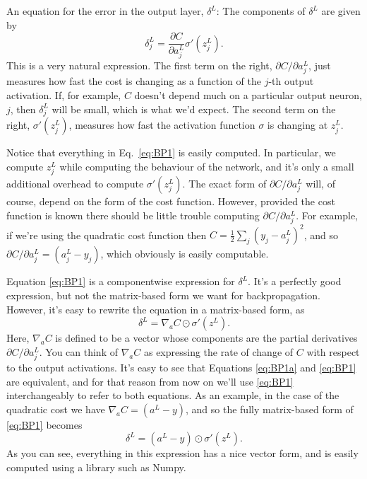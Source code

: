 \documentclass[a4paper,twoside,10pt]{book}
\begin{document}
An equation for the error in the output layer, $\delta^L$: The components of $\delta^L$ are given by
\begin{equation}
	\delta^L_j = \frac{\partial C}{\partial a^L_j} \sigma'(z^L_j).
	\tag{BP1}
	\label{eq:BP1}
\end{equation}
This is a very natural expression. The first term on the right, $\partial{}C/\partial{}a^L_j$, just measures how fast the cost is changing as a function of the $j$-th output activation. If, for example, $C$ doesn't depend much on a particular output neuron, $j$, then $\delta^L_j$ will be small, which is what we'd expect. The second term on the right, $\sigma'(z^L_j)$, measures how fast the activation function $\sigma$ is changing at $z^L_j$.

Notice that everything in Eq.~\ref{eq:BP1} is easily computed. In particular, we compute $z^L_j$ while computing the behaviour of the network, and it's only a small additional overhead to compute $\sigma'(z^L_j)$. The exact form of $\partial{}C/\partial{}a^L_j$ will, of course, depend on the form of the cost function. However, provided the cost function is known there should be little trouble computing $\partial{}C/\partial{}a^L_j$. For example, if we're using the quadratic cost function then $C=\frac12\sum_j(y_j-a^L_j)^2$, and so $\partial{}C/\partial{}a^L_j=(a^L_j-y_j)$, which obviously is easily computable.

Equation \ref{eq:BP1} is a componentwise expression for $\delta^L$. It's a perfectly good expression, but not the matrix-based form we want for backpropagation. However, it's easy to rewrite the equation in a matrix-based form, as
\begin{equation}
\delta^L = \nabla_a C \odot \sigma'(z^L).
\tag{BP1a}
\label{eq:BP1a}
\end{equation}
Here, $\nabla_a C$ is defined to be a vector whose components are the partial derivatives $\partial{}C/\partial{}a^L_j$. You can think of $\nabla_a C$ as expressing the rate of change of $C$ with respect to the output activations. It's easy to see that Equations \ref{eq:BP1a} and \ref{eq:BP1} are equivalent, and for that reason from now on we'll use \ref{eq:BP1} interchangeably to refer to both equations. As an example, in the case of the quadratic cost we have $\nabla_a C =(a^L-y)$, and so the fully matrix-based form of \ref{eq:BP1} becomes
\begin{equation}
\delta^L = (a^L-y) \odot \sigma'(z^L).
\label{eq:30}
\end{equation}
As you can see, everything in this expression has a nice vector form, and is easily computed using a library such as Numpy.
\end{document}
